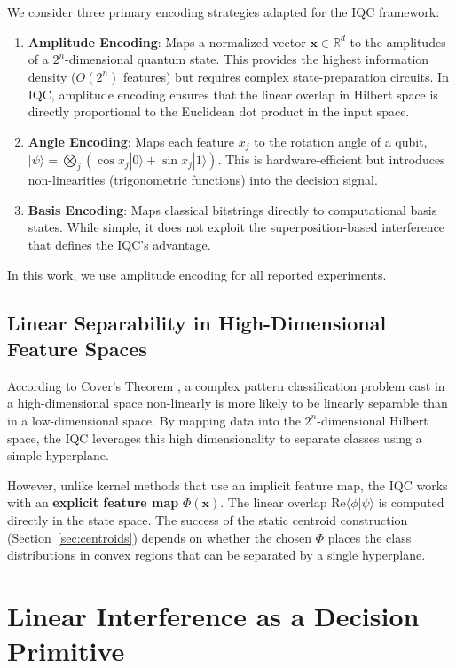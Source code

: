\documentclass[conference]{IEEEtran}
\begin{document}
We consider three primary encoding strategies adapted for the IQC framework:
\begin{enumerate}
    \item \textbf{Amplitude Encoding}: Maps a normalized vector $\mathbf{x} \in \mathbb{R}^d$ to the amplitudes of a $2^n$-dimensional quantum state. This provides the highest information density ($O(2^n)$ features) but requires complex state-preparation circuits. In IQC, amplitude encoding ensures that the linear overlap in Hilbert space is directly proportional to the Euclidean dot product in the input space.
    \item \textbf{Angle Encoding}: Maps each feature $x_j$ to the rotation angle of a qubit, $|\psi\rangle = \bigotimes_j ( \cos x_j |0\rangle + \sin x_j |1\rangle)$. This is hardware-efficient but introduces non-linearities (trigonometric functions) into the decision signal.
    \item \textbf{Basis Encoding}: Maps classical bitstrings directly to computational basis states. While simple, it does not exploit the superposition-based interference that defines the IQC's advantage.
\end{enumerate}
In this work, we use amplitude encoding for all reported experiments.

\subsection{Linear Separability in High-Dimensional Feature Spaces}

According to Cover's Theorem \cite{cover1965geometrical}, a complex pattern classification problem cast in a high-dimensional space non-linearly is more likely to be linearly separable than in a low-dimensional space. By mapping data into the $2^n$-dimensional Hilbert space, the IQC leverages this high dimensionality to separate classes using a simple hyperplane.

However, unlike kernel methods that use an implicit feature map, the IQC works with an \textbf{explicit feature map} $\Phi(\mathbf{x})$. The linear overlap $\mathrm{Re}\langle \phi | \psi \rangle$ is computed directly in the state space. The success of the static centroid construction (Section~\ref{sec:centroids}) depends on whether the chosen $\Phi$ places the class distributions in convex regions that can be separated by a single hyperplane.

\section{Linear Interference as a Decision Primitive}
\end{document}
